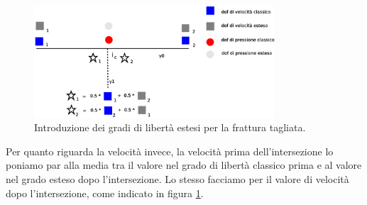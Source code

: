 \begin{figure}[htbp]
\begin{center}
\includegraphics[width=0.8\textwidth]{img/cap6/xfem.eps}
\caption{Introduzione dei gradi di libertà estesi per la frattura tagliata.}\label{xfem}
\end{center}
\end{figure}

\noindent Per quanto riguarda la velocità invece, la velocità prima dell'intersezione lo poniamo par alla media tra il valore nel grado di libertà classico prima e al valore nel grado esteso dopo l'intersezione. Lo stesso facciamo per il valore di velocità dopo l'intersezione, come indicato in figura \ref{xfem}. \\

